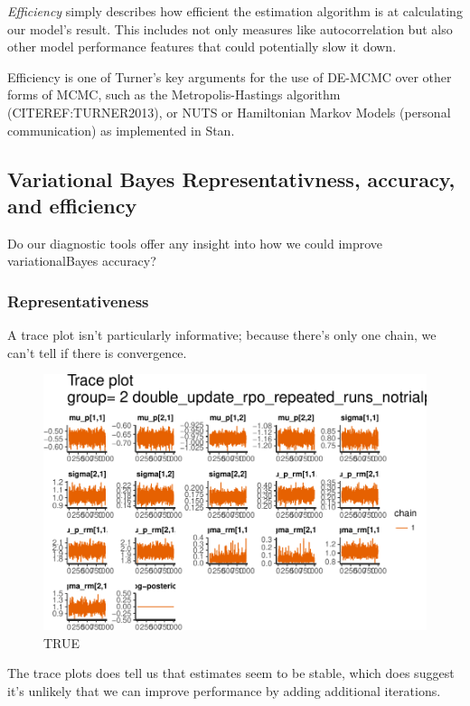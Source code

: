 \documentclass[]{article}
\begin{document}
\emph{Efficiency} simply describes how efficient the estimation
algorithm is at calculating our model's result. This includes not only
measures like autocorrelation but also other model performance features
that could potentially slow it down.

Efficiency is one of Turner's key arguments for the use of DE-MCMC over
other forms of MCMC, such as the Metropolis-Hastings algorithm
(CITEREF:TURNER2013), or NUTS or Hamiltonian Markov Models (personal
communication) as implemented in Stan.

\subsection{Variational Bayes Representativness, accuracy, and
efficiency}\label{variational-bayes-representativness-accuracy-and-efficiency}

Do our diagnostic tools offer any insight into how we could improve
variationalBayes accuracy?

\subsubsection{Representativeness}\label{representativeness-1}

A trace plot isn't particularly informative; because there's only one
chain, we can't tell if there is convergence.

\begin{figure}[htbp]
\centering
\includegraphics{compare_vb_and_MCMC_files/figure-latex/VBTraceplot-1.pdf}
\caption{TRUE}
\end{figure}

The trace plots does tell us that estimates seem to be stable, which
does suggest it's unlikely that we can improve performance by adding
additional iterations.
\end{document}
